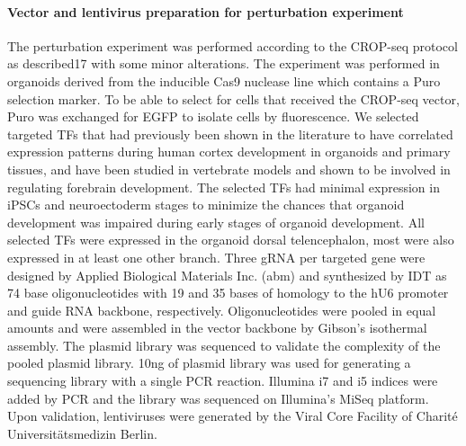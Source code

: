 \paragraph{Vector and lentivirus preparation for perturbation experiment}
The perturbation experiment was performed according to the CROP-seq protocol as described17 with some minor alterations. The experiment was performed in organoids derived from the inducible Cas9 nuclease line which contains a Puro selection marker. To be able to select for cells that received the CROP-seq vector, Puro was exchanged for EGFP to isolate cells by fluorescence. We selected targeted TFs that had previously been shown in the literature to have correlated expression patterns during human cortex development in organoids and primary tissues, and have been studied in vertebrate models and shown to be involved in regulating forebrain development. The selected TFs had minimal expression in iPSCs and neuroectoderm stages to minimize the chances that organoid development was impaired during early stages of organoid development. All selected TFs were expressed in the organoid dorsal telencephalon, most were also expressed in at least one other branch. Three gRNA per targeted gene were designed by Applied Biological Materials Inc. (abm) and synthesized by IDT as 74 base oligonucleotides with 19 and 35 bases of homology to the hU6 promoter and guide RNA backbone, respectively. Oligonucleotides were pooled in equal amounts and were assembled in the vector backbone by Gibson’s isothermal assembly. The plasmid library was sequenced to validate the complexity of the pooled plasmid library. 10ng of plasmid library was used for generating a sequencing library with a single PCR reaction. Illumina i7 and i5 indices were added by PCR and the library was sequenced on Illumina’s MiSeq platform. Upon validation, lentiviruses were generated by the Viral Core Facility of Charité Universitätsmedizin Berlin.
 
